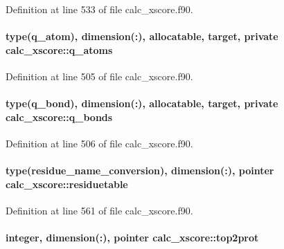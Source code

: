 Definition at line 533 of file calc\-\_\-xscore.\-f90.

\hypertarget{classcalc__xscore_a7e3421178a8858e85f63d02142911796}{
\paragraph[{q\-\_\-atoms}]{\setlength{\rightskip}{0pt plus 5cm}type({\bf q\-\_\-atom}), dimension(\-:), allocatable, target, private calc\-\_\-xscore\-::q\-\_\-atoms\hspace{0.3cm}{\ttfamily [private]}}}\label{classcalc__xscore_a7e3421178a8858e85f63d02142911796}


Definition at line 505 of file calc\-\_\-xscore.\-f90.

\hypertarget{classcalc__xscore_a64b353528653c15ccdf5d5dc6bcfbc9c}{
\paragraph[{q\-\_\-bonds}]{\setlength{\rightskip}{0pt plus 5cm}type({\bf q\-\_\-bond}), dimension(\-:), allocatable, target, private calc\-\_\-xscore\-::q\-\_\-bonds\hspace{0.3cm}{\ttfamily [private]}}}\label{classcalc__xscore_a64b353528653c15ccdf5d5dc6bcfbc9c}


Definition at line 506 of file calc\-\_\-xscore.\-f90.

\hypertarget{classcalc__xscore_a62b1d7ae7994c42117aec60039e299c3}{
\paragraph[{residuetable}]{\setlength{\rightskip}{0pt plus 5cm}type({\bf residue\-\_\-name\-\_\-conversion}), dimension(\-:), pointer calc\-\_\-xscore\-::residuetable}}\label{classcalc__xscore_a62b1d7ae7994c42117aec60039e299c3}


Definition at line 561 of file calc\-\_\-xscore.\-f90.

\hypertarget{classcalc__xscore_aebe63f3ce296f45ec9981bb543365496}{
\paragraph[{top2prot}]{\setlength{\rightskip}{0pt plus 5cm}integer, dimension(\-:), pointer calc\-\_\-xscore\-::top2prot}}\label{classcalc__xscore_aebe63f3ce296f45ec9981bb543365496}


